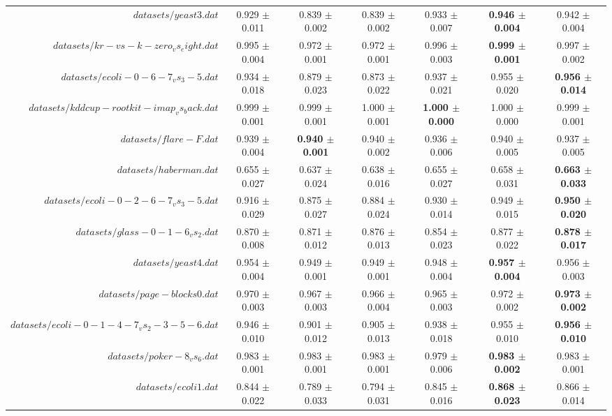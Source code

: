 \begin{table}[!ht]
{\begin{tabular}{r c c c c c c}
$datasets/yeast3.dat$ & 0.929 $\pm$ 0.011 & 0.839 $\pm$ 0.002 & 0.839 $\pm$ 0.002 & 0.933 $\pm$ 0.007 & \textbf{0.946 $\pm$ 0.004} & 0.942 $\pm$ 0.004 \\
$datasets/kr-vs-k-zero_vs_eight.dat$ & 0.995 $\pm$ 0.004 & 0.972 $\pm$ 0.001 & 0.972 $\pm$ 0.001 & 0.996 $\pm$ 0.003 & \textbf{0.999 $\pm$ 0.001} & 0.997 $\pm$ 0.002 \\
$datasets/ecoli-0-6-7_vs_3-5.dat$ & 0.934 $\pm$ 0.018 & 0.879 $\pm$ 0.023 & 0.873 $\pm$ 0.022 & 0.937 $\pm$ 0.021 & 0.955 $\pm$ 0.020 & \textbf{0.956 $\pm$ 0.014} \\
$datasets/kddcup-rootkit-imap_vs_back.dat$ & 0.999 $\pm$ 0.001 & 0.999 $\pm$ 0.001 & 1.000 $\pm$ 0.001 & \textbf{1.000 $\pm$ 0.000} & 1.000 $\pm$ 0.000 & 0.999 $\pm$ 0.001 \\
$datasets/flare-F.dat$ & 0.939 $\pm$ 0.004 & \textbf{0.940 $\pm$ 0.001} & 0.940 $\pm$ 0.002 & 0.936 $\pm$ 0.006 & 0.940 $\pm$ 0.005 & 0.937 $\pm$ 0.005 \\
$datasets/haberman.dat$ & 0.655 $\pm$ 0.027 & 0.637 $\pm$ 0.024 & 0.638 $\pm$ 0.016 & 0.655 $\pm$ 0.027 & 0.658 $\pm$ 0.031 & \textbf{0.663 $\pm$ 0.033} \\
$datasets/ecoli-0-2-6-7_vs_3-5.dat$ & 0.916 $\pm$ 0.029 & 0.875 $\pm$ 0.027 & 0.884 $\pm$ 0.024 & 0.930 $\pm$ 0.014 & 0.949 $\pm$ 0.015 & \textbf{0.950 $\pm$ 0.020} \\
$datasets/glass-0-1-6_vs_2.dat$ & 0.870 $\pm$ 0.008 & 0.871 $\pm$ 0.012 & 0.876 $\pm$ 0.013 & 0.854 $\pm$ 0.023 & 0.877 $\pm$ 0.022 & \textbf{0.878 $\pm$ 0.017} \\
$datasets/yeast4.dat$ & 0.954 $\pm$ 0.004 & 0.949 $\pm$ 0.001 & 0.949 $\pm$ 0.001 & 0.948 $\pm$ 0.004 & \textbf{0.957 $\pm$ 0.004} & 0.956 $\pm$ 0.003 \\
$datasets/page-blocks0.dat$ & 0.970 $\pm$ 0.003 & 0.967 $\pm$ 0.003 & 0.966 $\pm$ 0.004 & 0.965 $\pm$ 0.003 & 0.972 $\pm$ 0.002 & \textbf{0.973 $\pm$ 0.002} \\
$datasets/ecoli-0-1-4-7_vs_2-3-5-6.dat$ & 0.946 $\pm$ 0.010 & 0.901 $\pm$ 0.012 & 0.905 $\pm$ 0.013 & 0.938 $\pm$ 0.018 & 0.955 $\pm$ 0.010 & \textbf{0.956 $\pm$ 0.010} \\
$datasets/poker-8_vs_6.dat$ & 0.983 $\pm$ 0.001 & 0.983 $\pm$ 0.001 & 0.983 $\pm$ 0.001 & 0.979 $\pm$ 0.006 & \textbf{0.983 $\pm$ 0.002} & 0.983 $\pm$ 0.001 \\
$datasets/ecoli1.dat$ & 0.844 $\pm$ 0.022 & 0.789 $\pm$ 0.033 & 0.794 $\pm$ 0.031 & 0.845 $\pm$ 0.016 & \textbf{0.868 $\pm$ 0.023} & 0.866 $\pm$ 0.014 \\

\end{tabular}}
\end{table}
